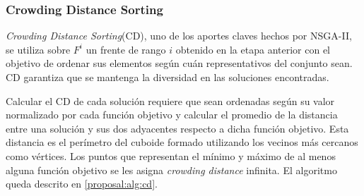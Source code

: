 

\subsubsection{Crowding Distance Sorting}
\textit{Crowding Distance Sorting}(CD), uno de los aportes claves hechos por NSGA-II, se utiliza sobre  $F^i$ un frente de rango $i$ obtenido en la etapa anterior con el objetivo de ordenar sus elementos seg\'un cu\'an representativos del conjunto sean. CD garantiza que se mantenga la diversidad en las soluciones encontradas.

Calcular el CD de cada soluci\'on requiere que sean ordenadas seg\'un su valor normalizado por cada funci\'on objetivo y calcular el promedio de la distancia entre una soluci\'on y sus dos adyacentes respecto a dicha funci\'on objetivo. Esta distancia es el per\'imetro del cuboide formado utilizando los vecinos m\'as cercanos como v\'ertices. Los puntos que representan el m\'inimo y m\'aximo de al menos alguna funci\'on objetivo se les asigna \textit{crowding distance} infinita. El  algoritmo queda descrito en \ref{proposal:alg:cd}.

